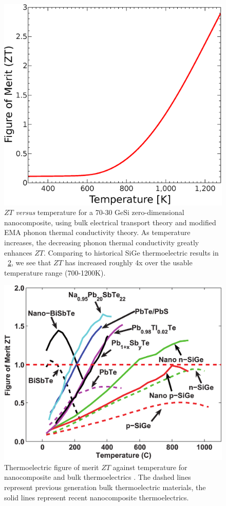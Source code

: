 \documentclass[12pt]{article}
\newcommand{\figref}[2][\figurename~]{#1\ref{#2}}
\newcommand{\tms}{\textsf{x} }
\begin{document}
\begin{figure}
	\centering
	\includegraphics[width=\textwidth]{ZT-10nm.eps}
	\caption{$ZT$ \emph{versus} temperature for a 70-30 GeSi zero-dimensional nanocomposite, using bulk electrical transport theory and modified EMA \cite{mema} phonon thermal conductivity theory. As temperature increases, the decreasing phonon thermal conductivity greatly enhances $ZT$. Comparing to historical SiGe thermoelectric results in \figref{zt-plot}, we see that $ZT$ has increased roughly 4\tms over the usable temperature range (700-1200K).}
	\label{fig:zt-10nm}
\end{figure}

\begin{figure}
	\centering
	\includegraphics[width=\textwidth]{zt-temp-plot.png}
	\caption{Thermoelectric figure of merit $ZT$ against temperature for nanocomposite and bulk thermoelectrics \cite{minnich-review}. The dashed lines represent previous generation bulk thermoelectric materials, the solid lines represent recent nanocomposite thermoelectrics.}
	\label{zt-plot}
\end{figure}
\end{document}
